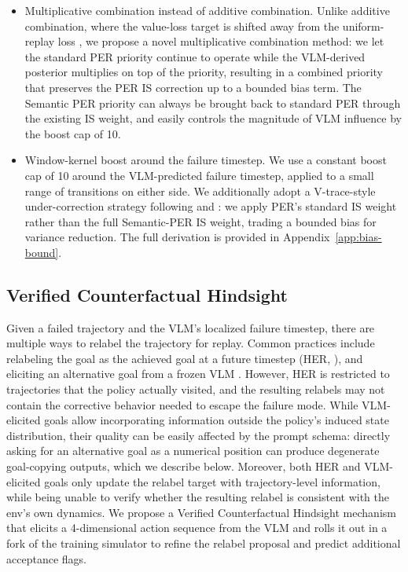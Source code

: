 \documentclass{article}
\begin{document}
\begin{itemize}\itemsep0pt
\item Multiplicative combination instead of additive combination.
Unlike additive combination, where the value-loss target is
shifted away from the uniform-replay loss
\citep{sharony2026vlmrb}, we propose a novel multiplicative
combination method: we let the standard PER priority continue to
operate while the VLM-derived posterior multiplies on top of the
priority, resulting in a combined priority that preserves the PER
IS correction up to a bounded bias term. The Semantic PER priority
can always be brought back to standard PER through the existing IS
weight, and easily controls the magnitude of VLM influence by the
boost cap of 10.
\item Window-kernel boost around the failure timestep. We use a
constant boost cap of 10 around the VLM-predicted failure
timestep, applied to a small range of transitions on either side.
We additionally adopt a V-trace-style under-correction strategy
following \citet{espeholt2018impala} and \citet{munos2016retrace}:
we apply PER's standard IS weight rather than the full Semantic-PER
IS weight, trading a bounded bias for variance reduction. The full
derivation is provided in Appendix~\ref{app:bias-bound}.
\end{itemize}

\subsection{Verified Counterfactual Hindsight}
\label{sec:method:verified}

Given a failed trajectory and the VLM's localized failure timestep,
there are multiple ways to relabel the trajectory for replay. Common
practices include relabeling the goal as the achieved goal at a
future timestep (HER, \citealp{andrychowicz2017her}), and eliciting
an alternative goal from a frozen VLM
\citep{rocamonde2024vlmreward}. However, HER is restricted to
trajectories that the policy actually visited, and the resulting
relabels may not contain the corrective behavior needed to escape
the failure mode. While VLM-elicited goals allow incorporating
information outside the policy's induced state distribution, their
quality can be easily affected by the prompt schema: directly asking
for an alternative goal as a numerical position can produce
degenerate goal-copying outputs, which we describe below. Moreover,
both HER and VLM-elicited goals only update the relabel target with
trajectory-level information, while being unable to verify whether
the resulting relabel is consistent with the env's own dynamics. We
propose a Verified Counterfactual Hindsight mechanism that elicits
a 4-dimensional action sequence from the VLM and rolls it out in a
fork of the training simulator to refine the relabel proposal and
predict additional acceptance flags.
\end{document}
